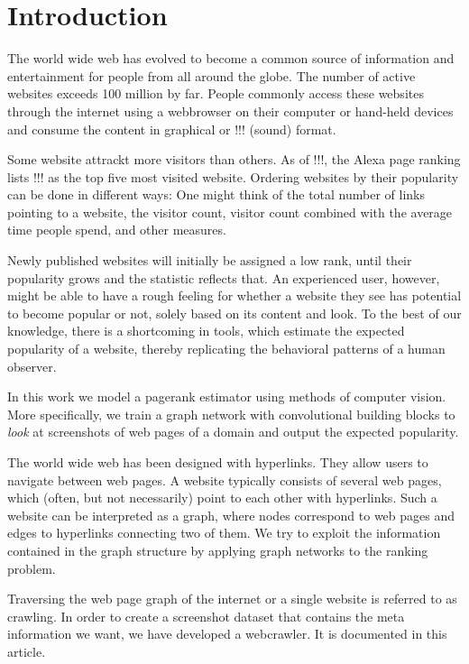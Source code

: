 \section{Introduction}
\label{section:introduction}

The world wide web has evolved to become a common source of information and entertainment for people from all around the globe. The number of active websites exceeds 100 million by far. People commonly access these websites through the internet using a webbrowser on their computer or hand-held devices and consume the content in graphical or !!! (sound) format.

Some website attrackt more visitors than others. As of !!!, the Alexa page ranking lists !!! as the top five most visited website. Ordering websites by their popularity can be done in different ways: One might think of the total number of links pointing to a website, the visitor count, visitor count combined with the average time people spend, and other measures.

Newly published websites will initially be assigned a low rank, until their popularity grows and the statistic reflects that. An experienced user, however, might be able to have a rough feeling for whether a website they see has potential to become popular or not, solely based on its content and look. To the best of our knowledge, there is a shortcoming in tools, which estimate the expected popularity of a website, thereby replicating the behavioral patterns of a human observer.

In this work we model a pagerank estimator using methods of computer vision. More specifically, we train a graph network with convolutional building blocks to \textit{look} at screenshots of web pages of a domain and output the expected popularity.

The world wide web has been designed with hyperlinks. They allow users to navigate between web pages. A website typically consists of several web pages, which (often, but not necessarily) point to each other with hyperlinks. Such a website can be interpreted as a graph, where nodes correspond to web pages and edges to hyperlinks connecting two of them. We try to exploit the information contained in the graph structure by applying graph networks to the ranking problem.

Traversing the web page graph of the internet or a single website is referred to as crawling. In order to create a screenshot dataset that contains the meta information we want, we have developed a webcrawler. It is documented in this article.

